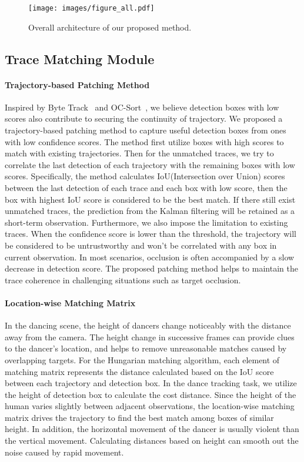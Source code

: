 \documentclass[10pt,twocolumn,letterpaper]{article}
\begin{document}
\begin{figure*}
\centering
\texttt{[image: images/figure\_all.pdf]}
\caption{Overall architecture of our proposed method.}
\label{fig:architecture}
\end{figure*}

\subsection{Trace Matching Module}

\paragraph{Trajectory-based Patching Method} Inspired by Byte Track~\cite{zhang2021bytetrack} and OC-Sort~\cite{cao2022observation}, we believe detection boxes with low scores also contribute to securing the continuity of trajectory. We proposed a trajectory-based patching method to capture useful detection boxes from ones with low confidence scores. The method first utilize boxes with high scores to match with existing trajectories. Then for the unmatched traces, we try to correlate the last detection of each trajectory with the remaining boxes with low scores. Specifically, the method calculates IoU(Intersection over Union) scores between the last detection of each trace and each box with low score, then the box with highest IoU score is considered to be the best match. If there still exist unmatched traces, the prediction from the Kalman filtering will be retained as a short-term observation. Furthermore, we also impose the limitation to existing traces. When the confidence score is lower than the threshold, the trajectory will be considered to be untrustworthy and won't be correlated with any box in current observation. In most scenarios, occlusion is often accompanied by a slow decrease in detection score. The proposed patching method helps to maintain the trace coherence in challenging situations such as target occlusion.

\paragraph{Location-wise Matching Matrix} In the dancing scene, the height of dancers change noticeably with the distance away from the camera. The height change in successive frames can provide clues to the dancer's location, and helps to remove unreasonable matches caused by overlapping targets. For the Hungarian matching algorithm, each element of matching matrix represents the distance calculated based on the IoU score between each trajectory and detection box. In the dance tracking task, we utilize the height of detection box to calculate the cost distance. Since the height of the human varies slightly between adjacent observations, the location-wise matching matrix 
drives the trajectory to find the best match among boxes of similar height. In addition, the horizontal movement of the dancer is usually violent than the vertical movement. Calculating distances based on height can smooth out the noise caused by rapid movement. 
\end{document}
